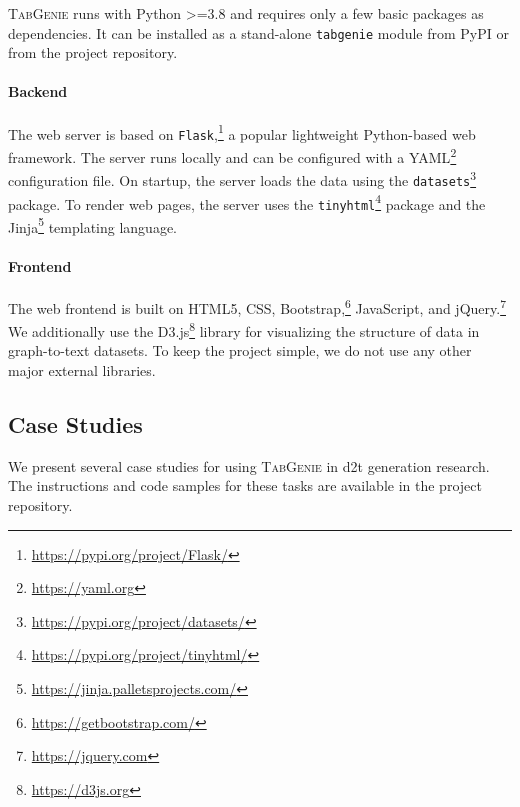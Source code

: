 \textsc{TabGenie} runs with Python >=3.8 and requires only a few basic packages as dependencies. It can be installed as a stand-alone \texttt{tabgenie} module from PyPI or from the project repository.

\paragraph{Backend} The web server is based on \texttt{Flask},\footnote{\url{https://pypi.org/project/Flask/}} a popular lightweight Python-based web framework. The server runs locally and can be configured with a YAML\footnote{\url{https://yaml.org}} configuration file. On startup, the server loads the data using the \texttt{datasets}\footnote{\url{https://pypi.org/project/datasets/}} package. To render web pages, the server uses the \texttt{tinyhtml}\footnote{\url{https://pypi.org/project/tinyhtml/}} package and the Jinja\footnote{\url{https://jinja.palletsprojects.com/}} templating language.

\paragraph{Frontend} The web frontend is built on HTML5, CSS, Bootstrap,\footnote{\url{https://getbootstrap.com/}} JavaScript, and jQuery.\footnote{\url{https://jquery.com}} We additionally use the D3.js\footnote{\url{https://d3js.org}} library for visualizing the structure of data in graph-to-text datasets. To keep the project simple, we do not use any other major external libraries.


\subsection{Case Studies}
\label{sec:tabgenie:casestudies}

We present several case studies for using \textsc{TabGenie} in \ac{d2t} generation research. The instructions and code samples for these tasks are available in the project repository.

